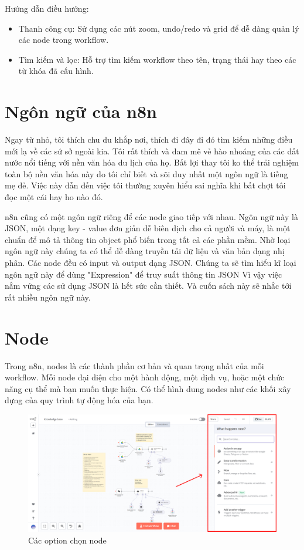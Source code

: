     
Hướng dẫn điều hướng:
\begin{itemize}
    \item Thanh công cụ: Sử dụng các nút zoom, undo/redo và grid để dễ dàng quản lý các node trong workflow.
    \item Tìm kiếm và lọc: Hỗ trợ tìm kiếm workflow theo tên, trạng thái hay theo các từ khóa đã cấu hình.
\end{itemize}

\section{Ngôn ngữ của n8n}
Ngay từ nhỏ, tôi thích chu du khắp nơi, thích đi đây đi đó tìm kiếm những điều mới lạ về các sứ sở ngoài kia. Tôi rất thích và đam mê vẻ hào nhoáng của các đất nước nổi tiếng với nền văn hóa du lịch của họ. Bất lợi thay tôi ko thể trải nghiệm toàn bộ nền văn hóa này do tôi chỉ biết và sõi duy nhất một ngôn ngữ là tiếng mẹ đẻ. Việc này dẫn đến việc tôi thường xuyên hiểu sai nghĩa khi bất chợt tôi đọc một cái hay ho nào đó. 

n8n cũng có một ngôn ngữ riêng để các node giao tiếp với nhau. Ngôn ngữ này là JSON, một dạng key - value đơn giản dễ biên dịch cho cả người và máy, là một chuẩn để mô tả thông tin object phổ biến trong tất cả các phần mềm. Nhờ loại ngôn ngữ này chúng ta có thể dễ dàng truyền tải dữ liệu và văn bản dạng nhị phân. Các node đều có input và output dạng JSON. Chúng ta sẽ tìm hiểu kĩ loại ngôn ngữ này để dùng "Expression" để truy suất thông tin JSON  Vì vậy việc nắm vứng các sử dụng JSON là hết sức cần thiết. Và cuốn sách này sẽ nhắc tới rất nhiều ngôn ngữ này. 


\section{Node}

Trong n8n, nodes là các thành phần cơ bản và quan trọng nhất của mỗi workflow. Mỗi node đại diện cho một hành động, một dịch vụ, hoặc một chức năng cụ thể mà bạn muốn thực hiện. Có thể hình dung nodes như các khối xây dựng của quy trình tự động hóa của bạn.

\begin{figure}[htbp]
    \centering
    \includegraphics[width=1\linewidth]{Chap1-7/node.pdf}
    \caption{Các option chọn node}
\end{figure}


